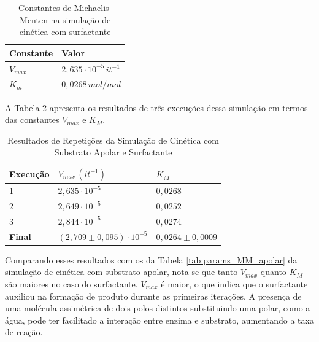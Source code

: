 \documentclass[12pt,oneside]{report}
\begin{document}
\begin{table}[H]
    \centering
    \caption{Constantes de Michaelis-Menten na simulação de cinética com surfactante}
    \vspace{0.2cm}
    \begin{tabularx}{\textwidth}{X m{5cm}}
        \hline
        \textbf{Constante} & \textbf{Valor}                     \\
        \hline
        $V_{max}$          & $2{,}635 \cdot 10^{-5} \, it^{-1}$ \\
        $K_m$              & $0{,}0268 \, mol/mol$              \\
        \hline
    \end{tabularx}
    \vspace{0.2cm}
    \label{tab:params_MM_surfactant}
\end{table}

A Tabela \ref{tab:surf_repeticoes} apresenta os resultados de três execuções dessa simulação em termos das constantes $V_{max}$ e $K_M$.

\begin{table}[H]
    \centering
    \caption{Resultados de Repetições da Simulação de Cinética com Substrato Apolar e Surfactante}
    \vspace{0.2cm}
    \begin{tabularx}{\textwidth}{X X m{5cm}}
        \hline
        \textbf{Execução} & \textbf{$V_{max} \, (it^{-1})$ }      & \textbf{$K_M$}          \\
        \hline
        1                 & $2{,}635 \cdot 10^{-5}$               & $0{,}0268$              \\
        2                 & $2{,}649 \cdot 10^{-5}$               & $0{,}0252$              \\
        3                 & $2{,}844 \cdot 10^{-5}$               & $0{,}0274$              \\
        \hline
        \textbf{Final}    & $(2{,}709 \pm 0{,}095) \cdot 10^{-5}$ & $0{,}0264 \pm 0{,}0009$ \\
        \hline
    \end{tabularx}
    \vspace{0.2cm}
    \label{tab:surf_repeticoes}
\end{table}

Comparando esses resultados com os da Tabela \ref{tab:params_MM_apolar} da simulação de cinética com substrato apolar, nota-se que tanto $V_{max}$ quanto $K_M$ são maiores no caso do surfactante. $V_{max}$ é maior, o que indica que o surfactante auxiliou na formação de produto durante as primeiras iterações. A presença de uma molécula assimétrica de dois polos distintos substituindo uma polar, como a água, pode ter facilitado a interação entre enzima e substrato, aumentando a taxa de reação.
\end{document}
